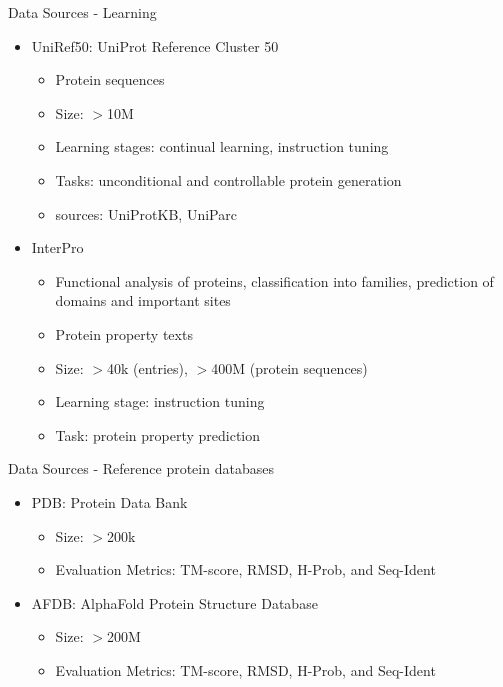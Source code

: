 \begin{frame}{Data Sources - Learning}
	\begin{itemize}\setlength\itemsep{3em}
		\item UniRef50: UniProt Reference Cluster 50~\cite{suzek2015uniref}
		\begin{itemize}
			\item Protein sequences
			\item Size: $>$10M
			\item Learning stages: continual learning, instruction tuning
			\item Tasks: unconditional and controllable protein generation
			\item sources: UniProtKB, UniParc
		\end{itemize}
		\item InterPro~\cite{paysan2023interpro}
		\begin{itemize}
			\item Functional analysis of proteins, classification into families, prediction of domains and important sites
			\item Protein property texts
			\item Size: $>$40k (entries), $>$400M (protein sequences)
			\item Learning stage: instruction tuning
			\item Task: protein property prediction
		\end{itemize}
	\end{itemize}
\end{frame}

\begin{frame}{Data Sources - Reference protein databases}
	\begin{itemize}\setlength\itemsep{3em}
		\item PDB: Protein Data Bank~\cite{berman2002protein}
		\begin{itemize}
			\item Size: $>$200k
			\item Evaluation Metrics: TM-score, RMSD, H-Prob, and Seq-Ident
		\end{itemize}
		\item AFDB: AlphaFold Protein Structure Database~\cite{varadi2022alphafold}
		\begin{itemize}
			\item Size: $>$200M
			\item Evaluation Metrics: TM-score, RMSD, H-Prob, and Seq-Ident
		\end{itemize}
	\end{itemize}
\end{frame}